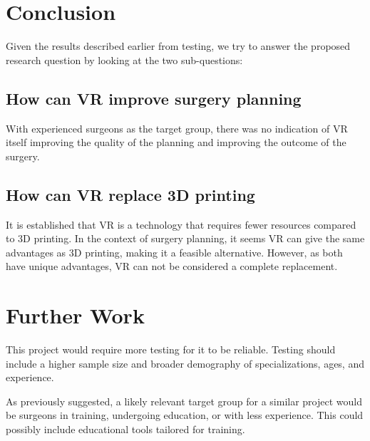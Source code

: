 \documentclass[a4paper]{report}
\begin{document}
\chapter{Conclusion}
Given the results described earlier from testing, we try to answer the proposed research question by looking at the two sub-questions:

\section{How can VR improve surgery planning}
With experienced surgeons as the target group, there was no indication of VR itself improving the quality of the planning and improving the outcome of the surgery. 

\section{How can VR replace 3D printing}
It is established that VR is a technology that requires fewer resources compared to 3D printing. In the context of surgery planning, it seems VR can give the same advantages as 3D printing, making it a feasible alternative. However, as both have unique advantages, VR can not be considered a complete replacement.


\chapter{Further Work}
This project would require more testing for it to be reliable. Testing should include a higher sample size and broader demography of specializations, ages, and experience.

As previously suggested, a likely relevant target group for a similar project would be surgeons in training, undergoing education, or with less experience. This could possibly include educational tools tailored for training.

\appendix



%
%
\printbibliography
\end{document}
